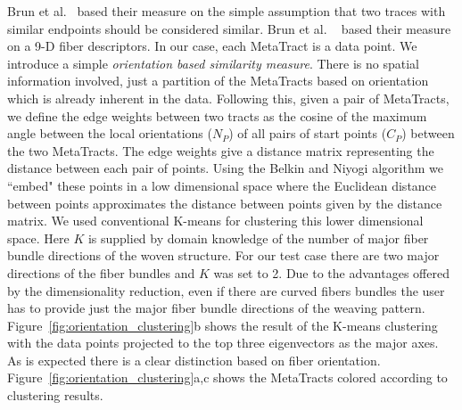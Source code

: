 Brun et al.~\cite{Brun2003} based their measure on the simple assumption that two traces with similar endpoints should be considered similar. Brun et al. ~\cite{Brun2004} based their measure on a 9-D fiber descriptors. In our case, each MetaTract is a data point. We introduce a simple \textit{orientation based similarity measure}. There is no spatial information involved, just a partition of the MetaTracts based on orientation which is already inherent in the data.
Following this, given a pair of  MetaTracts, we define the edge weights between two tracts as the cosine of the maximum angle between the local orientations ($N_P$) of all pairs of start points ($C_P$) between the two MetaTracts. The edge weights give a distance matrix representing the distance between each pair of points. Using the Belkin and Niyogi algorithm we ``embed" these points in a low dimensional space where the Euclidean distance between points approximates the distance between points given by the distance matrix. 
%
%  
We used conventional K-means for clustering this lower dimensional space. Here $K$ is supplied by domain knowledge of the number of major fiber bundle directions of the woven structure.
For our test case there are two major directions of the fiber bundles and $K$ was set to 2. Due to the advantages offered by the dimensionality reduction, even if there are curved fibers bundles the user has to provide just the major fiber bundle directions of the weaving pattern. Figure~\ref{fig:orientation_clustering}b shows the result of the K-means clustering with the data points projected to the top three eigenvectors as the major axes. As is expected there is a clear distinction based on fiber orientation. Figure~\ref{fig:orientation_clustering}a,c shows the MetaTracts colored according to clustering results.


